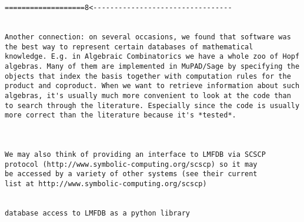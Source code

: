 \begin{Workpackage}{\thewpno}
\begin{verbatim}
===================8<---------------------------------


Another connection: on several occasions, we found that software was
the best way to represent certain databases of mathematical
knowledge. E.g. in Algebraic Combinatorics we have a whole zoo of Hopf
algebras. Many of them are implemented in MuPAD/Sage by specifying the
objects that index the basis together with computation rules for the
product and coproduct. When we want to retrieve information about such
algebras, it's usually much more convenient to look at the code than
to search through the literature. Especially since the code is usually
more correct than the literature because it's *tested*.



We may also think of providing an interface to LMFDB via SCSCP
protocol (http://www.symbolic-computing.org/scscp) so it may
be accessed by a variety of other systems (see their current
list at http://www.symbolic-computing.org/scscp)


database access to LMFDB as a python library


\end{verbatim}
\end{Workpackage}
